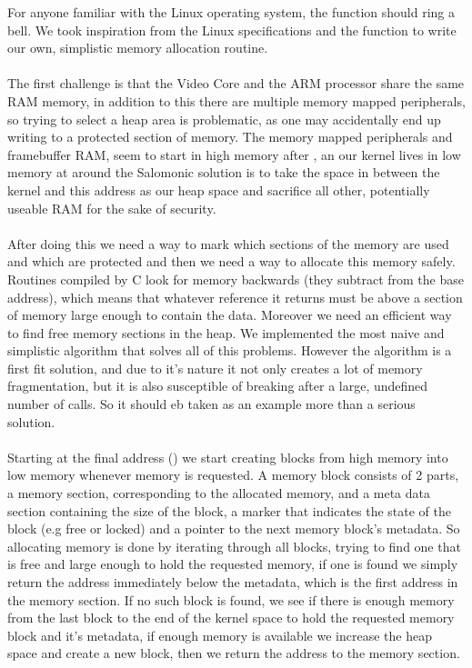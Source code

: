 \documentclass[12pt, svgnames]{book}
\begin{document}
For anyone familiar with the Linux operating system, the  function should ring a bell. We took inspiration from the Linux specifications and the  function to write our own, simplistic memory allocation routine.
\\~\\
The first challenge is that the Video Core and the ARM processor share the same RAM memory, in addition to this there are multiple memory mapped peripherals, so trying to select a heap area is problematic, as one may accidentally end up writing to a protected section of memory. The memory mapped peripherals and framebuffer RAM, seem to start in high memory after , an our kernel lives in low memory at around  the Salomonic solution is to take the space in between the kernel and this address as our heap space and sacrifice all other, potentially useable RAM for the sake of security.
\\~\\
After doing this we need a way to mark which sections of the memory are used and which are protected and then we need a way to allocate this memory safely. Routines compiled by C look for memory backwards (they subtract from the base address), which means that whatever reference it returns must be above a section of memory large enough to contain the data. Moreover we need an efficient way to find free memory sections in the heap. We implemented the most naive and simplistic algorithm that solves all of this problems. However the algorithm is a first fit solution, and due to it's nature it not only creates a lot of memory fragmentation, but it is also susceptible of breaking after a large, undefined number of calls. So it should eb taken as an example more than a serious solution.
\\~\\
Starting at the final address () we start creating blocks from high memory into low memory whenever memory is requested. A memory block consists of 2 parts, a memory section, corresponding to the allocated memory, and a meta data section containing the size of the block, a marker that indicates the state of the block (e.g free or locked) and a pointer to the next memory block's metadata. So allocating memory is done by iterating through all blocks, trying to find one that is free and large enough to hold the requested memory, if one is found we simply return the address immediately below the metadata, which is the first address in the memory section. If no such block is found, we see if there is enough memory from the last block to the end of the kernel space to hold the requested memory block and it's metadata, if enough memory is available we increase the heap space and create a new block, then we return the address to the memory section.
\end{document}
